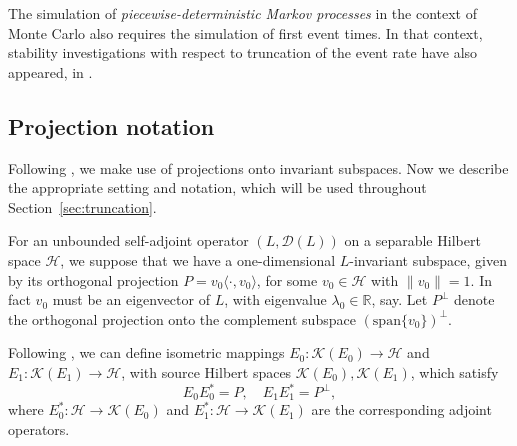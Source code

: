 \documentclass{aptpub}
\newcommand{\Dom}{\mathcal D}
\newcommand{\lspan}{\mathrm{span}}
\renewcommand{\H}{\mathcal H}
\begin{document}
The simulation of \textit{piecewise-deterministic Markov processes} in the context of Monte Carlo \cite{Bierkens2019, Bouchard-Cote2018} also requires the simulation of first event times. In that context, stability investigations with respect to truncation of the event rate have also appeared, in \cite[Section 10]{Durmus2021}.


\subsection{Projection notation}
\label{subsec:projection_notation}

Following \cite{DavisKahan1970}, we make use of projections onto invariant subspaces. Now we describe the appropriate setting and notation, which will be used throughout Section~\ref{sec:truncation}.

For an unbounded self-adjoint operator $(L, \Dom(L))$ on a separable Hilbert space $\H$, we suppose that we have a one-dimensional $L$-invariant subspace, given by its orthogonal projection $P=v_0 \langle \cdot, v_0\rangle$, for some $v_0\in\mathcal{H}$ with $\|v_0\|=1$. In fact $v_0$ must be an eigenvector of $L$, with eigenvalue  $\lambda_0\in\mathbb{R}$, say.
Let 
$P^{\perp}$
denote the orthogonal projection onto the complement subspace $(\lspan\{v_0\})^\perp$.

Following \cite{DavisKahan1970}, we can define isometric mappings $E_0: \mathcal K(E_0) \to \H$ and $E_1: \mathcal K (E_1) \to \H$, with source Hilbert spaces $\mathcal K(E_0), \mathcal K(E_1)$, which satisfy
\begin{equation*}
    E_0 E_0^* = P,\quad E_1 E_1^* = P^{\perp},
\end{equation*}
where $E_0^*: \H \to \mathcal K(E_0)$ and $E_1^*: \H \to \mathcal K(E_1)$ are the corresponding adjoint operators.
\end{document}
